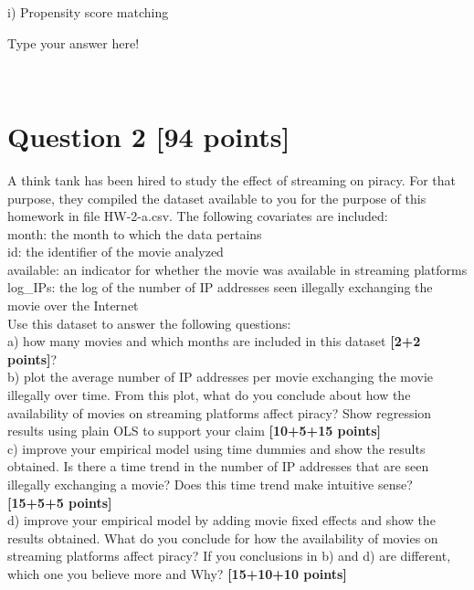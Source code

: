 \documentclass{article}
\begin{document}
i) Propensity score matching\\

\vspace{1cm}

{\color{blue}

Type your answer here!
}\\

\section*{\color{black} Question 2 {\bf [94 points]}}

A think tank has been hired to study the effect of streaming on piracy. For that purpose, they compiled the dataset available to you for the purpose of this homework in file HW-2-a.csv. The following covariates are included:\\

month: the month to which the data pertains\\

id: the identifier of the movie analyzed\\

available: an indicator for whether the movie was available in streaming platforms\\

log\_IPs: the log of the number of IP addresses seen illegally exchanging the movie over the Internet\\

Use this dataset to answer the following questions:\\

a) how many movies and which months are included in this dataset {\bf [2+2 points]}?\\

b) plot the average number of IP addresses per movie exchanging the movie illegally over time. From this plot, what do you conclude about how the availability of movies on streaming platforms affect piracy? Show regression results using plain OLS to support your claim {\bf [10+5+15 points]}\\

c) improve your empirical model using time dummies and show the results obtained. Is there a time trend in the number of IP addresses that are seen illegally exchanging a movie? Does this time trend make intuitive sense? {\bf [15+5+5 points]}\\

d) improve your empirical model by adding movie fixed effects and show the results obtained. What do you conclude for how the availability of movies on streaming platforms affect piracy? If you conclusions in b) and d) are different, which one you believe more and Why? {\bf [15+10+10 points]}\\
\end{document}
